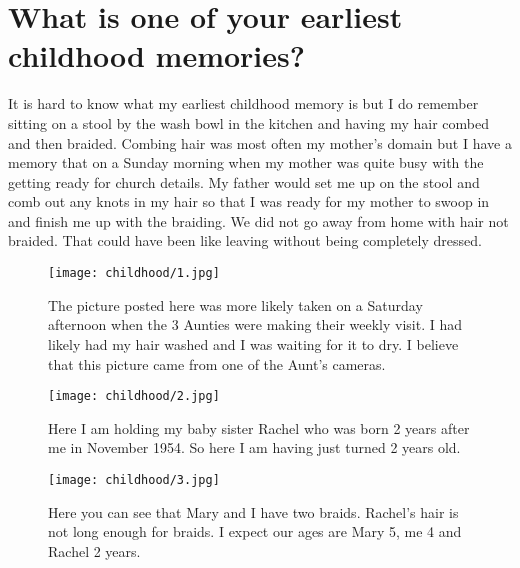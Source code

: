 \section{What is one of your earliest childhood memories?}
It is hard to know what my earliest childhood memory is but I do remember sitting on a stool by the wash bowl in the kitchen and having my hair combed and then braided.
Combing hair was most often my mother's domain but I have a memory that on a Sunday morning when my mother was quite busy with the getting ready for church details.
My father would set me up on the stool and comb out any knots in my hair so that I was ready for my mother to swoop in and finish me up with the braiding.
We did not go away from home with hair not braided.
That could have been like leaving without being completely dressed.

\begin{figure}
\centering
\texttt{[image: childhood/1.jpg]}
\caption{
The picture posted here was more likely taken on a Saturday afternoon when the 3 Aunties were making their weekly visit.
I had likely had my hair washed and I was waiting for it to dry.
I believe that this picture came from one of the Aunt's cameras.
}
\end{figure}

\begin{figure}
\centering
\texttt{[image: childhood/2.jpg]}
\caption{
Here I am holding my baby sister Rachel who was born 2 years after me in November 1954.
So here I am having just turned 2 years old.
}
\end{figure}
\begin{figure}
\centering
\texttt{[image: childhood/3.jpg]}
\caption{
Here you can see that Mary and I have two braids.
Rachel's hair is not long enough for braids.
I expect our ages are Mary 5, me 4 and Rachel 2 years.
}
\end{figure}

